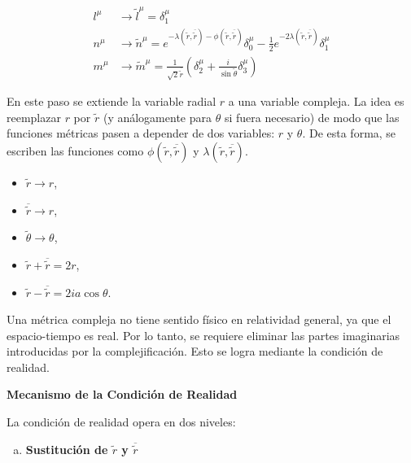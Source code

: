 \begin{enumerate}[1.]
          \begin{equation}
              \begin{aligned}
                  l^\mu & \rightarrow \tilde{l}^\mu = \delta_1^\mu                                                                                                                                                                  \\
                  n^\mu & \rightarrow \tilde{n}^\mu = e^{-\lambda(\tilde{r}, \overline{\tilde{r}}) - \phi(\tilde{r}, \overline{\tilde{r}})} \delta_0^\mu - \frac{1}{2} e^{-2 \lambda(\tilde{r}, \overline{\tilde{r}})} \delta_1^\mu \\
                  m^\mu & \rightarrow \tilde{m}^\mu = \frac{1}{\sqrt{2} \overline{\tilde{r}}} \left( \delta_2^\mu + \frac{i}{\sin \tilde{\theta}} \delta_3^\mu \right)
              \end{aligned}
          \end{equation}

          En este paso se extiende la variable radial $r$ a una variable compleja. La idea es reemplazar $r$ por $\tilde{r}$ (y análogamente para $\theta$ si fuera necesario) de modo que las funciones métricas pasen a depender de dos variables: $r$ y $\theta$. De esta forma, se escriben las funciones como $\phi(\tilde{r}, \overline{\tilde{r}})$ y $\lambda(\tilde{r}, \overline{\tilde{r}})$.

          \begin{itemize}
              \item $\tilde{r} \rightarrow r$,
              \item $\overline{\tilde{r}} \rightarrow r$,
              \item $\tilde{\theta} \rightarrow \theta$,
              \item $\tilde{r} + \overline{\tilde{r}} = 2r$,
              \item $\tilde{r} - \overline{\tilde{r}} = 2ia \cos \theta$.
          \end{itemize}
          \begin{note}
              Una métrica compleja no tiene sentido físico en relatividad general, ya que el espacio-tiempo es real. Por lo tanto, se requiere eliminar las partes imaginarias introducidas por la complejificación. Esto se logra mediante la condición de realidad.

              \textbf{Mecanismo de la Condición de Realidad}

              La condición de realidad opera en dos niveles:
              \begin{enumerate}[a.]
                  \item \textbf{Sustitución de $\tilde{r}$ y $\overline{\tilde{r}}$}


\end{enumerate}
\end{note}
\end{enumerate}
